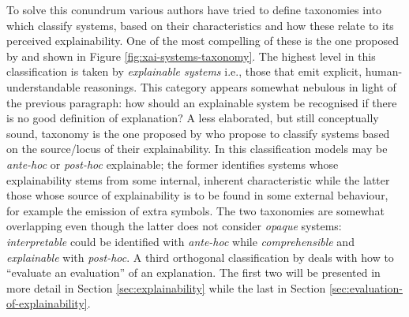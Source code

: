 To solve this conundrum various authors have tried to define taxonomies into which classify systems, based on their characteristics and how these relate to its perceived explainability.
One of the most compelling of these is the one proposed by \citet{Doran2018} and shown in Figure \ref{fig:xai-systems-taxonomy}.
The highest level in this classification is taken by \textit{explainable systems} i.e., those that emit explicit, human-understandable reasonings.
This category appears somewhat nebulous in light of the previous paragraph: how should an explainable system be recognised if there is no good definition of explanation?
A less elaborated, but still conceptually sound, taxonomy is the one proposed by \citet{mittelstadt2019explaining} who propose to classify systems based on the source/locus of their explainability.
In this classification models may be \textit{ante-hoc} or \textit{post-hoc} explainable; the former identifies systems whose explainability stems from some internal, inherent characteristic while the latter those whose source of explainability is to be found in some external behaviour, for example the emission of extra symbols.
The two taxonomies are somewhat overlapping even though the latter does not consider \textit{opaque} systems: \textit{interpretable} could be identified with \textit{ante-hoc} while \textit{comprehensible} and \textit{explainable} with \textit{post-hoc}.
A third orthogonal classification by \citet{doshi2017towards} deals with how to \enquote{evaluate an evaluation} of an explanation.
The first two will be presented in more detail in Section \ref{sec:explainability} while the last in Section \ref{sec:evaluation-of-explainability}.

